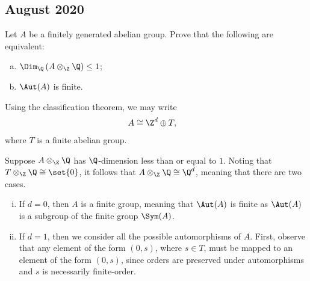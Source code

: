 \documentclass[10pt]{mypackage}
\begin{document}
\subsection{August 2020}%
\begin{problem}[Problem 1]
  Let $A$ be a finitely generated abelian group. Prove that the following are equivalent:
  \begin{enumerate}[(a)]
    \item $\Dim_{\Q}\left( A\otimes_{\Z}\Q \right)\leq 1$;
    \item $\Aut(A)$ is finite.
  \end{enumerate}
\end{problem}
\begin{solution}
  Using the classification theorem, we may write
  \begin{align*}
    A &\cong \Z^{d} \oplus T,
  \end{align*}
  where $T$ is a finite abelian group.

  Suppose $A\otimes_{\Z}\Q$ has $\Q$-dimension less than or equal to $1$. Noting that $T\otimes_{\Z}\Q \cong \set{0}$, it follows that $A\otimes_{\Z}\Q\cong \Q^{d}$, meaning that there are two cases.
  \begin{enumerate}[(i)]
    \item If $d = 0$, then $A$ is a finite group, meaning that $\Aut(A)$ is finite as $\Aut(A)$ is a subgroup of the finite group $\Sym(A)$.
    \item If $d = 1$, then we consider all the possible automorphisms of $A$. First, observe that any element of the form $\left( 0,s \right)$, where $s\in T$, must be mapped to an element of the form $\left( 0,s \right)$, since orders are preserved under automorphisms and $s$ is necessarily finite-order.


\end{enumerate}
\end{solution}
\end{document}
